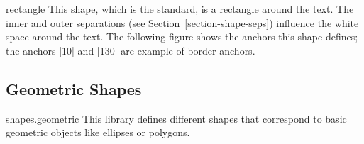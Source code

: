 \begin{shape}{rectangle}
  This shape, which is the standard, is a rectangle around the
  text. The inner   and outer separations (see
  Section~\ref{section-shape-seps}) influence the white space around
  the text. The following figure shows the anchors this
  shape defines; the anchors |10| and |130| are example of border anchors.
\begin{codeexample}[]
\Huge
{}
\end{codeexample}
\end{shape}



\subsection{Geometric Shapes}

\begin{pgflibrary}{shapes.geometric}
  This library defines different shapes that correspond to basic
  geometric objects like ellipses or polygons.
\end{pgflibrary}


